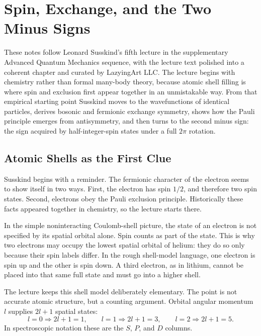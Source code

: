 \chapter{Spin, Exchange, and the Two Minus Signs}

These notes follow Leonard Susskind's fifth lecture in the supplementary Advanced Quantum Mechanics sequence, with the lecture text polished into a coherent chapter and curated by LazyingArt LLC. The lecture begins with chemistry rather than formal many-body theory, because atomic shell filling is where spin and exclusion first appear together in an unmistakable way. From that empirical starting point Susskind moves to the wavefunctions of identical particles, derives bosonic and fermionic exchange symmetry, shows how the Pauli principle emerges from antisymmetry, and then turns to the second minus sign: the sign acquired by half-integer-spin states under a full \(2\pi\) rotation.

\section{Atomic Shells as the First Clue}

Susskind begins with a reminder. The fermionic character of the electron seems to show itself in two ways. First, the electron has spin \(1/2\), and therefore two spin states. Second, electrons obey the Pauli exclusion principle. Historically these facts appeared together in chemistry, so the lecture starts there.

In the simple noninteracting Coulomb-shell picture, the state of an electron is not specified by its spatial orbital alone. Spin counts as part of the state. This is why two electrons may occupy the lowest spatial orbital of helium: they do so only because their spin labels differ. In the rough shell-model language, one electron is spin up and the other is spin down. A third electron, as in lithium, cannot be placed into that same full state and must go into a higher shell.

The lecture keeps this shell model deliberately elementary. The point is not accurate atomic structure, but a counting argument. Orbital angular momentum \(l\) supplies \(2l+1\) spatial states:
\begin{equation}
l=0 \Rightarrow 2l+1=1,\qquad
l=1 \Rightarrow 2l+1=3,\qquad
l=2 \Rightarrow 2l+1=5.
\end{equation}
In spectroscopic notation these are the \(S\), \(P\), and \(D\) columns.

